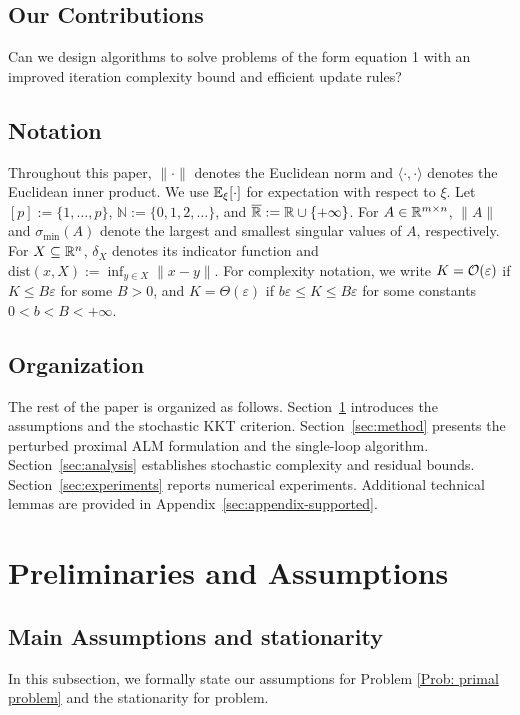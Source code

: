 \documentclass[10pt]{article}
\begin{document}
\subsection{Our Contributions}
\text
Can we design algorithms to solve problems of the form equation 1 with an improved iteration complexity bound and efficient update rules?

\subsection{Notation}
Throughout this paper, $\|\cdot\|$ denotes the Euclidean norm and $\langle\cdot,\cdot\rangle$ denotes the Euclidean inner product. We use $\mathbb{E}_{\xi}[\cdot]$ for expectation with respect to $\xi$. Let $[p]:=\{1,\ldots,p\}$, $\mathbb{N}:=\{0,1,2,\ldots\}$, and $\overline{\mathbb{R}}:=\mathbb{R}\cup\{+\infty\}$. For $A\in\mathbb{R}^{m\times n}$, $\|A\|$ and $\sigma_{\min}(A)$ denote the largest and smallest singular values of $A$, respectively. For $X\subseteq\mathbb{R}^n$, $\delta_X$ denotes its indicator function and $\mathrm{dist}(x,X):=\inf_{y\in X}\|x-y\|$. For complexity notation, we write $K=\mathcal{O}(\varepsilon)$ if $K\leq B\varepsilon$ for some $B>0$, and $K=\Theta(\varepsilon)$ if $b\varepsilon\leq K\leq B\varepsilon$ for some constants $0<b<B<+\infty$.
\subsection{Organization}
The rest of the paper is organized as follows. Section~\ref{sec:prelim} introduces the assumptions and the stochastic KKT criterion. Section~\ref{sec:method} presents the perturbed proximal ALM formulation and the single-loop algorithm. Section~\ref{sec:analysis} establishes stochastic complexity and residual bounds. Section~\ref{sec:experiments} reports numerical experiments. Additional technical lemmas are provided in Appendix~\ref{sec:appendix-supported}.
\section{Preliminaries and Assumptions}
\label{sec:prelim}

\subsection{Main Assumptions and stationarity}
\label{Subsection: main assumptions}
In this subsection, we formally state our assumptions for Problem \eqref{Prob: primal problem} and the stationarity for problem.
\end{document}
